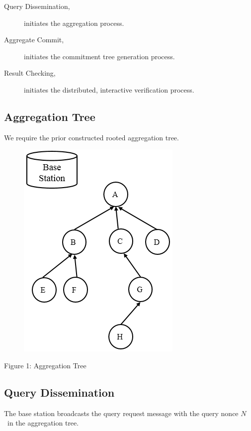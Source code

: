 \documentclass[%
  slidesonly,%
  semlayer%
  ]{seminar}                                  %
\begin{document}
\begin{slide}
      \begin{description}
        \item [Query Dissemination,] initiates the aggregation process.
        \item [Aggregate Commit,] initiates the commitment tree generation process.
        \item [Result Checking,] initiates the distributed, interactive verification process.
      \end{description}
      \vfill
      \clearpage

    \subsection*{Aggregation Tree}
      \vfill
      We require the prior constructed rooted aggregation tree.
      \begin{figure}[h!]
        \centering
        \includegraphics[scale=0.4]{images/aggregation-tree-1.png}
        \label{fig:Aggregation-tree-1}
      \end{figure}
      \begin{center}
        Figure 1: Aggregation Tree
      \end{center}
      \vfill
      \clearpage

    \subsection*{Query Dissemination}
      \vfill
      The base station broadcasts the query request message with the query nonce $N$\ in the aggregation tree. 
    

\end{slide}
\end{document}
